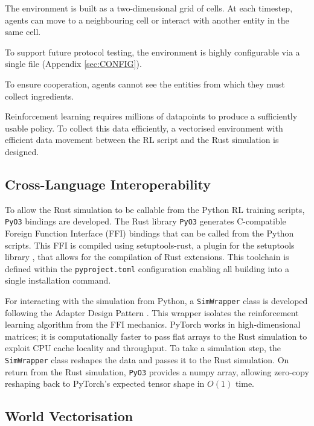 The environment is built as a two-dimensional grid of cells.
At each timestep, agents can move to a neighbouring cell or interact with another entity in the same cell. 

To support future protocol testing, the environment is highly configurable via a single file (Appendix \ref{sec:CONFIG}).

To ensure cooperation, agents cannot see the entities from which they must collect ingredients.

Reinforcement learning requires millions of datapoints \cite{PPO} to produce a sufficiently usable policy.
To collect this data efficiently, a vectorised environment with efficient data movement between the RL script and the Rust simulation is designed.

\subsection{Cross-Language Interoperability}
\label{sec:3.2.2}

To allow the Rust simulation to be callable from the Python RL training scripts, \lstinline[language=Rust]|PyO3| \cite{pyo3_github} bindings are developed.
The Rust library \lstinline[language=Rust]|PyO3| generates C-compatible Foreign Function Interface (FFI) bindings that can be called from the Python scripts.
This FFI is compiled using setuptools-rust, a plugin for the setuptools library \cite{setuptoolsrust_pypi}, that allows for the compilation of Rust extensions.
This toolchain is defined within the \lstinline[language=bash]|pyproject.toml| configuration enabling all building into a single installation command.

For interacting with the simulation from Python, a \lstinline[language=Python]|SimWrapper| class is developed following the Adapter Design Pattern \cite{refactoringguru_adapter}.
This wrapper isolates the reinforcement learning algorithm from the FFI mechanics.
PyTorch works in high-dimensional matrices; it is computationally faster to pass flat arrays to the Rust simulation to exploit CPU cache locality and throughput.
To take a simulation step, the \lstinline[language=Python]|SimWrapper| class reshapes the data and passes it to the Rust simulation.
On return from the Rust simulation, \lstinline[language=Rust]|PyO3| provides a numpy \cite{numpy} array, allowing zero-copy reshaping back to PyTorch's expected tensor shape in $O(1)$ time.

\subsection{World Vectorisation}
\label{sec:3.2.3}

